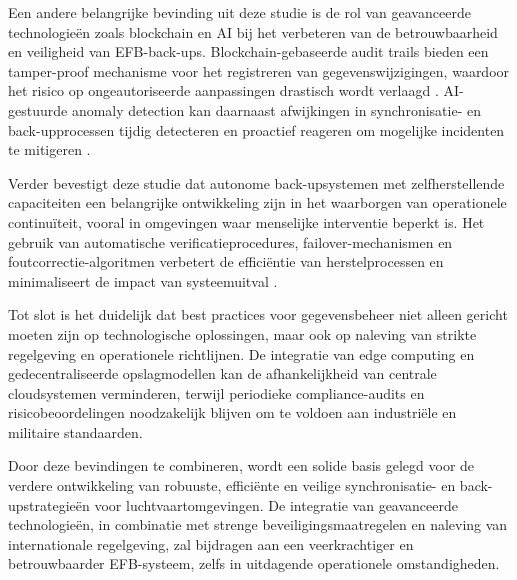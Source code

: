 Een andere belangrijke bevinding uit deze studie is de rol van geavanceerde technologieën zoals blockchain en AI bij het verbeteren van de betrouwbaarheid en veiligheid van EFB-back-ups. Blockchain-gebaseerde audit trails bieden een tamper-proof mechanisme voor het registreren van gegevenswijzigingen, waardoor het risico op ongeautoriseerde aanpassingen drastisch wordt verlaagd \autocite{VinayakBhuvi}. AI-gestuurde anomaly detection kan daarnaast afwijkingen in synchronisatie- en back-upprocessen tijdig detecteren en proactief reageren om mogelijke incidenten te mitigeren \autocite{Abdelaziz48PP100_116}.

Verder bevestigt deze studie dat autonome back-upsystemen met zelfherstellende capaciteiten een belangrijke ontwikkeling zijn in het waarborgen van operationele continuïteit, vooral in omgevingen waar menselijke interventie beperkt is. Het gebruik van automatische verificatieprocedures, failover-mechanismen en foutcorrectie-algoritmen verbetert de efficiëntie van herstelprocessen en minimaliseert de impact van systeemuitval \autocite{AWSBackup}.

Tot slot is het duidelijk dat best practices voor gegevensbeheer niet alleen gericht moeten zijn op technologische oplossingen, maar ook op naleving van strikte regelgeving en operationele richtlijnen. De integratie van edge computing en gedecentraliseerde opslagmodellen kan de afhankelijkheid van centrale cloudsystemen verminderen, terwijl periodieke compliance-audits en risicobeoordelingen noodzakelijk blijven om te voldoen aan industriële en militaire standaarden.

Door deze bevindingen te combineren, wordt een solide basis gelegd voor de verdere ontwikkeling van robuuste, efficiënte en veilige synchronisatie- en back-upstrategieën voor luchtvaartomgevingen. De integratie van geavanceerde technologieën, in combinatie met strenge beveiligingsmaatregelen en naleving van internationale regelgeving, zal bijdragen aan een veerkrachtiger en betrouwbaarder EFB-systeem, zelfs in uitdagende operationele omstandigheden.
